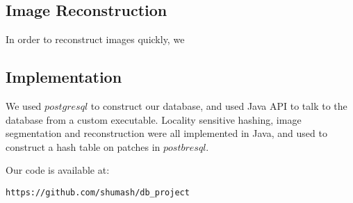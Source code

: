 \subsection{Image Reconstruction}\label{ssec:reconst}

In order to reconstruct images quickly, we

\subsection{Implementation}\label{ssec:impl}
We used $postgresql$ to construct our database, and used
Java API to talk to the database from a custom executable. Locality
sensitive hashing, image segmentation and reconstruction were
all implemented in Java, and used to construct a hash table
on patches in $postbresql$.

Our code is available at:
\begin{verbatim}
https://github.com/shumash/db_project
\end{verbatim}
